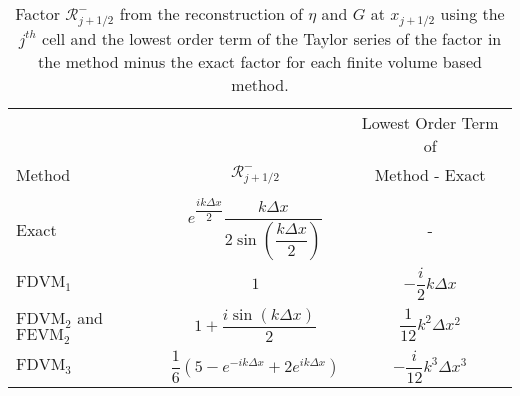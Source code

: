\begin{table}
	\centering
	\begin{tabular}{l  c  c}
		&&Lowest Order Term of	\\
		Method& $\mathcal{R}^-_{j+1/2}$ &  Method - Exact\B \\
		\hline \\
		Exact & $e^{\dfrac{ik\Delta x}{2}} \dfrac{k\Delta x}{2 \sin\left(\dfrac{k \Delta x}{2}\right)}$ & - \B \\
		$\text{FDVM}_1$& $1$ & $-\dfrac{i}{2}k \Delta x$  \T\B \\
		$\text{FDVM}_2$ and $\text{FEVM}_2$& $1 +  \dfrac{i \sin\left(k\Delta x \right)}{2}$ & $\dfrac{1}{12}k^2 \Delta x^2$  \T\B \\
		$\text{FDVM}_3$& $\dfrac{1}{6}\left({5 - e^{-i k {\Delta x}} +2 e^{i k {\Delta x}}} \right)$ & $-\dfrac{i}{12}k^3 \Delta x^3$  \T\B \\
		\hline
	\end{tabular}
	\caption{Factor $\mathcal{R}^-_{j+1/2}$ from the reconstruction of $\eta$ and $G$ at $x_{j+1/2}$ using the ${j^{th}}$ cell and the lowest order term of the Taylor series of the factor in the method minus the exact factor for each finite volume based method.}
	\label{tab:Rmfactor}
\end{table}
